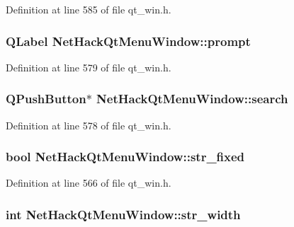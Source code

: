 Definition at line 585 of file qt\+\_\+win.\+h.

\hypertarget{classNetHackQtMenuWindow_a469aff3117dff7ccd1e985caefbe1378}{
\subsubsection[{prompt}]{\setlength{\rightskip}{0pt plus 5cm}Q\+Label Net\+Hack\+Qt\+Menu\+Window\+::prompt\hspace{0.3cm}{\ttfamily [private]}}}\label{classNetHackQtMenuWindow_a469aff3117dff7ccd1e985caefbe1378}


Definition at line 579 of file qt\+\_\+win.\+h.

\hypertarget{classNetHackQtMenuWindow_a81cb1543e789b743616b995777685046}{
\subsubsection[{search}]{\setlength{\rightskip}{0pt plus 5cm}Q\+Push\+Button$\ast$ Net\+Hack\+Qt\+Menu\+Window\+::search\hspace{0.3cm}{\ttfamily [private]}}}\label{classNetHackQtMenuWindow_a81cb1543e789b743616b995777685046}


Definition at line 578 of file qt\+\_\+win.\+h.

\hypertarget{classNetHackQtMenuWindow_a94a155d3ec5b1f2b1c96a9bb623abeb3}{
\subsubsection[{str\+\_\+fixed}]{\setlength{\rightskip}{0pt plus 5cm}bool Net\+Hack\+Qt\+Menu\+Window\+::str\+\_\+fixed\hspace{0.3cm}{\ttfamily [private]}}}\label{classNetHackQtMenuWindow_a94a155d3ec5b1f2b1c96a9bb623abeb3}


Definition at line 566 of file qt\+\_\+win.\+h.

\hypertarget{classNetHackQtMenuWindow_a164d38bebb6790a6dec8600c23eaf2b9}{
\subsubsection[{str\+\_\+width}]{\setlength{\rightskip}{0pt plus 5cm}int Net\+Hack\+Qt\+Menu\+Window\+::str\+\_\+width\hspace{0.3cm}{\ttfamily [private]}}}\label{classNetHackQtMenuWindow_a164d38bebb6790a6dec8600c23eaf2b9}


